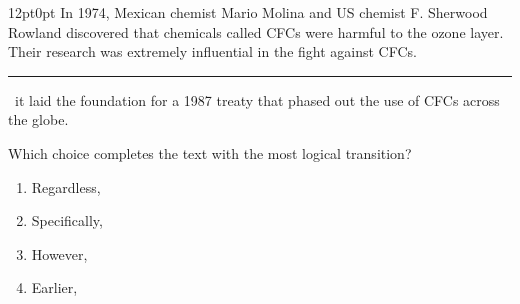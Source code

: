 \documentclass[11pt, twocolumn]{article}
\newcounter{questionnum}
\begin{document}
\vspace{6pt}\noindent
\begin{minipage}{\columnwidth}\raggedright
\noindent{}\par\vspace{8pt}
\begin{adjustwidth}{12pt}{0pt}
In 1974, Mexican chemist Mario Molina and US chemist F. Sherwood Rowland discovered that chemicals called CFCs were harmful to the ozone layer. Their research was extremely influential in the fight against CFCs. \,\rule{2cm}{0.4pt}\, it laid the foundation for a 1987 treaty that phased out the use of CFCs across the globe.
\vspace{6pt}

Which choice completes the text with the most logical transition?
\begin{enumerate}[label=\Alph*),leftmargin=18pt,topsep=3pt,itemsep=2pt]
  \item Regardless,
  \item Specifically,
  \item However,
  \item Earlier,
\end{enumerate}
\end{adjustwidth}
\end{minipage}\par
\end{document}
